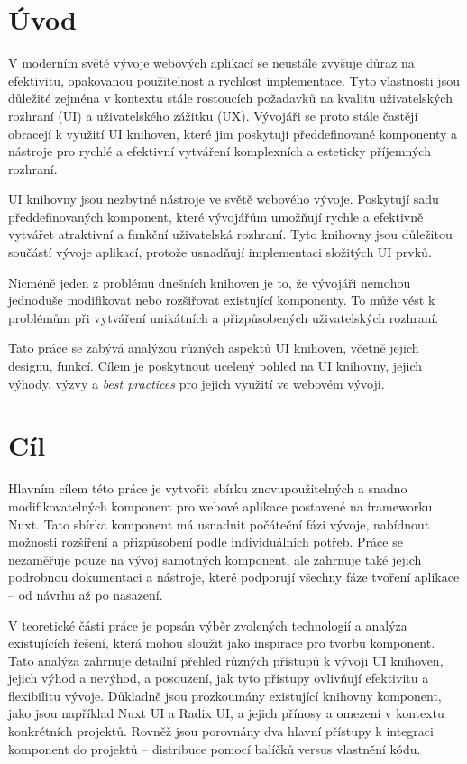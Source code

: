 
\chapter{Úvod}
V moderním světě vývoje webových aplikací se neustále zvyšuje důraz na efektivitu, opakovanou použitelnost a rychlost implementace. Tyto vlastnosti jsou důležité zejména v kontextu stále rostoucích požadavků na kvalitu uživatelských rozhraní (UI) a uživatelského zážitku (UX). Vývojáři se proto stále častěji obracejí k využití UI knihoven, které jim poskytují předdefinované komponenty a nástroje pro rychlé a efektivní vytváření komplexních a esteticky příjemných rozhraní.

UI knihovny jsou nezbytné nástroje ve světě webového vývoje. Poskytují sadu předdefinovaných komponent, které vývojářům umožňují rychle a efektivně vytvářet atraktivní a funkční uživatelská rozhraní. Tyto knihovny jsou důležitou součástí vývoje aplikací, protože usnadňují implementaci složitých UI prvků.

Nicméně jeden z problému dnešních knihoven je to, že vývojáři nemohou jednoduše modifikovat nebo rozšiřovat existující komponenty. To může vést k problémům při vytváření unikátních a přizpůsobených uživatelských rozhraní.

Tato práce se zabývá analýzou různých aspektů UI knihoven, včetně jejich designu, funkcí. Cílem je poskytnout ucelený pohled na UI knihovny, jejich výhody, výzvy a \emph{best practices} pro jejich využití ve webovém vývoji.


\chapter{Cíl}
Hlavním cílem této práce je vytvořit sbírku znovupoužitelných a snadno modifikovatelných komponent pro webové aplikace postavené na frameworku Nuxt. Tato sbírka komponent má usnadnit počáteční fázi vývoje, nabídnout možnosti rozšíření a přizpůsobení podle individuálních potřeb. Práce se nezaměřuje pouze na vývoj samotných komponent, ale zahrnuje také jejich podrobnou dokumentaci a nástroje, které podporují všechny fáze tvoření aplikace – od návrhu až po nasazení.

V teoretické části práce je popsán výběr zvolených technologií a analýza existujících řešení, která mohou sloužit jako inspirace pro tvorbu komponent. Tato analýza zahrnuje detailní přehled různých přístupů k vývoji UI knihoven, jejich výhod a nevýhod, a posouzení, jak tyto přístupy ovlivňují efektivitu a flexibilitu vývoje. Důkladně jsou prozkoumány existující knihovny komponent, jako jsou například Nuxt UI a Radix UI, a jejich přínosy a omezení v kontextu konkrétních projektů. Rovněž jsou porovnány dva hlavní přístupy k integraci komponent do projektů – distribuce pomocí balíčků versus vlastnění kódu.

